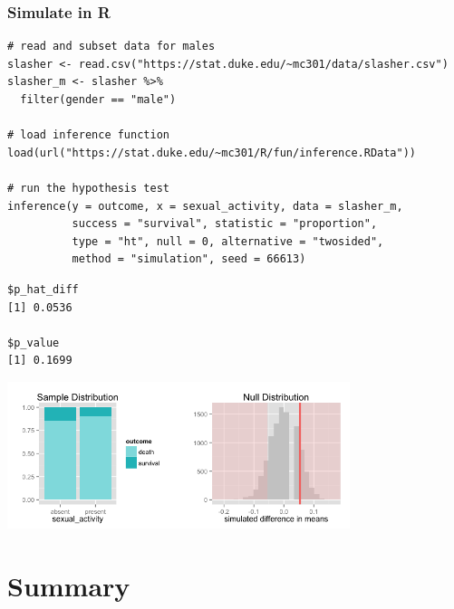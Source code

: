 \documentclass[slidestop,compress,mathserif,12pt,t,professionalfonts,xcolor=table]{beamer}
\begin{document}

\begin{frame}[fragile]
\frametitle{Simulate in R}

\vspace{-0.25cm}

{\tiny
\begin{Verbatim}[frame=single, formatcom=\color{blue}]
# read and subset data for males
slasher <- read.csv("https://stat.duke.edu/~mc301/data/slasher.csv")
slasher_m <- slasher %>%
  filter(gender == "male")
  
# load inference function
load(url("https://stat.duke.edu/~mc301/R/fun/inference.RData"))

# run the hypothesis test
inference(y = outcome, x = sexual_activity, data = slasher_m,
          success = "survival", statistic = "proportion", 
          type = "ht", null = 0, alternative = "twosided", 
          method = "simulation", seed = 66613)
\end{Verbatim}
}

\pause

{\tiny
\begin{Verbatim}[frame=single, formatcom=\color{gray}]
$p_hat_diff
[1] 0.0536

$p_value
[1] 0.1699
\end{Verbatim}
}

\includegraphics[width=0.75\textwidth]{figures/slasher/male_rand}

\end{frame}


\begin{frame}

\vfill


\vfill

\end{frame}


\section{Summary}
\end{document}
